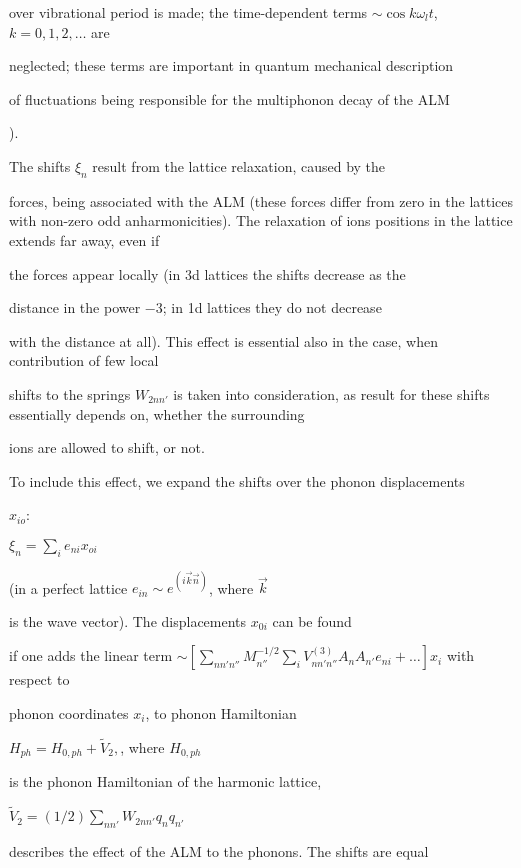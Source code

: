 over vibrational period is made; the
 time-dependent terms 
$\sim \cos{k \omega_{l} t}$, $k=0,1,2,\ldots$ are 

neglected; these terms are important in quantum mechanical description

of fluctuations being responsible for the multiphonon decay of the ALM

\cite{hizhrev,hizhnev}).  




The shifts $\xi_n$ result from the lattice relaxation, caused by the

forces, being associated with the ALM (these forces differ from zero 
in the lattices with non-zero odd anharmonicities). The relaxation of 
ions positions 
in the lattice extends far away, even if 

the forces appear locally (in 3d lattices the shifts decrease as the 

distance in the power $-3$; in 1d lattices they do not decrease 

with the distance at all). This effect is essential also in the case, 
when contribution of few local 

shifts to the springs $W_{2nn'}$ is taken into consideration, as
result for these shifts essentially depends on, whether the surrounding

ions are allowed to shift, or not. 

To include this effect, we expand the shifts over the phonon displacements 

$x_{io}$: 

$\xi_n= \sum_i e_{ni} x_{oi}$

(in a perfect lattice $e_{in} \sim e^{(i\vec{k} \vec{n})}$, where $\vec{k}$

is the wave vector). The displacements $x_{0i}$ can be found

if one adds the linear term   $\sim [\sum_{n n' n''} M_{n''}^{-1/2}\sum_i

 V^{(3)}_{n n' n''} A_n A_{n'} e_{ni} + \ldots] x_i$ with respect to 

phonon coordinates $x_i$, to phonon Hamiltonian

$H_{ph} = H_{0,ph} + \tilde{V}_2,$, where $H_{0,ph}$

is the phonon Hamiltonian of the harmonic lattice, 

$\tilde{V}_2  = (1/2) \sum_{nn'}W_{2 n n'}q_n q_{n'}$

describes the effect of the ALM to the phonons.  The shifts are equal

